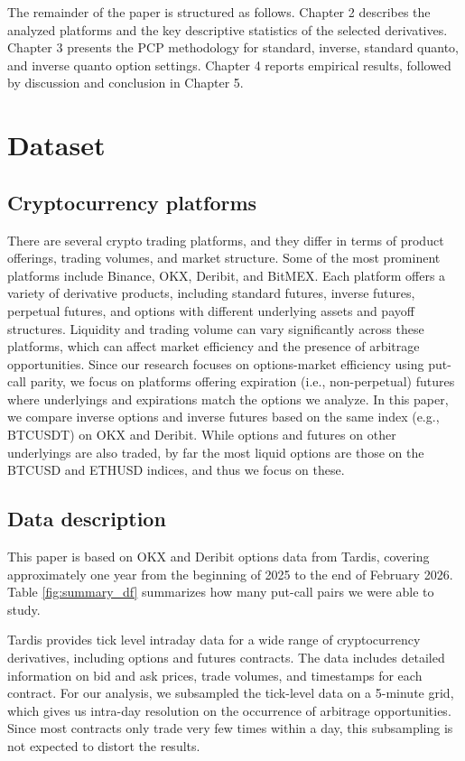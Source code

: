 \documentclass[12pt]{article}
\begin{document}
The remainder of the paper is structured as follows. Chapter 2 describes the analyzed platforms and the key descriptive statistics of the selected derivatives. Chapter 3 presents the PCP methodology for standard, inverse, standard quanto, and inverse quanto option settings. Chapter 4 reports empirical results, followed by discussion and conclusion in Chapter 5.

\section{Dataset}

\subsection{Cryptocurrency platforms}

There are several crypto trading platforms, and they differ in terms of product offerings, trading volumes, and market structure. Some of the most prominent platforms include Binance, OKX, Deribit, and BitMEX. Each platform offers a variety of derivative products, including standard futures, inverse futures, perpetual futures, and options with different underlying assets and payoff structures. Liquidity and trading volume can vary significantly across these platforms, which can affect market efficiency and the presence of arbitrage opportunities. Since our research focuses on options-market efficiency using put-call parity, we focus on platforms offering expiration (i.e., non-perpetual) futures where underlyings and expirations match the options we analyze. In this paper, we compare inverse options and inverse futures based on the same index (e.g., BTCUSDT) on OKX and Deribit. While options and futures on other underlyings are also traded, by far the most liquid options are those on the BTCUSD and ETHUSD indices, and thus we focus on these.

\subsection{Data description}

This paper is based on OKX and Deribit options data from Tardis, covering approximately one year from the beginning of 2025 to the end of February 2026. Table \ref{fig:summary_df} summarizes how many put-call pairs we were able to study.

Tardis provides tick level intraday data for a wide range of cryptocurrency derivatives, including options and futures contracts. The data includes detailed information on bid and ask prices, trade volumes, and timestamps for each contract. For our analysis, we subsampled the tick-level data on a 5-minute grid, which gives us intra-day resolution on the occurrence of arbitrage opportunities. Since most contracts only trade very few times within a day, this subsampling is not expected to distort the results.
\end{document}
